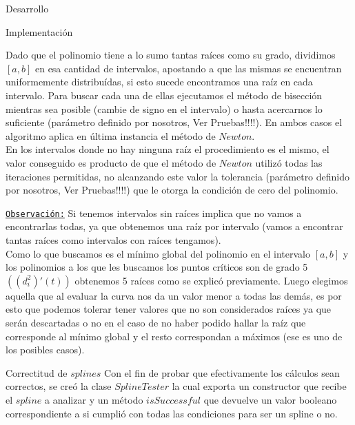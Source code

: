 \begin{section}{Desarrollo}
\begin{subsection}{Implementación}
\begin{itemize}
				Dado que el polinomio tiene a lo sumo tantas raíces como su grado, dividimos $[a,b]$ en esa cantidad de intervalos, apostando a que
				las mismas se encuentran uniformemente distribuídas, si esto sucede encontramos una raíz en cada intervalo. Para buscar cada una de 
				ellas ejecutamos el método de bisección mientras sea posible (cambie de signo en el intervalo) o hasta acercarnos lo suficiente
				(parámetro definido por nosotros, Ver Pruebas!!!!). En ambos casos el algoritmo aplica en última instancia el método de $Newton$.\\
				En los intervalos donde no hay ninguna raíz el procedimiento es el mismo, el valor conseguido es producto de que el método de 
				$Newton$ utilizó todas las iteraciones permitidas, no alcanzando este valor la tolerancia (parámetro definido por nosotros, Ver Pruebas!!!!) que le otorga la condición de cero del
				polinomio.
				
				\underline{\texttt{Observación:}} Si tenemos intervalos sin raíces implica que no vamos a encontrarlas todas, ya que obtenemos una raíz por intervalo (vamos a encontrar tantas raíces como intervalos con raíces tengamos).\\
				
				Como lo que buscamos es el mínimo global del polinomio en el intervalo $[a,b]$ y los polinomios a los que les buscamos los puntos críticos son de grado 5 $((d_i^2)'(t))$ obtenemos 5 raíces como se explicó previamente. Luego elegimos aquella que al evaluar la curva nos da un valor menor a todas las demás, es por esto que podemos tolerar tener valores que no son considerados raíces ya que serán descartadas o no en el caso de no haber podido hallar la raíz que corresponde al mínimo global y el resto correspondan a máximos (ese es uno de los posibles casos).
		\end{itemize}
	\end{subsection}
	\begin{subsection}{Correctitud de $splines$}
		Con el fin de probar que efectivamente los cálculos sean correctos, se creó la clase $SplineTester$ la cual exporta un constructor que recibe el $spline$ a analizar y un método $isSuccessful$ que devuelve un valor booleano correspondiente a si cumplió con todas las condiciones para ser un spline o no.
		

\end{subsection}
\end{section}
